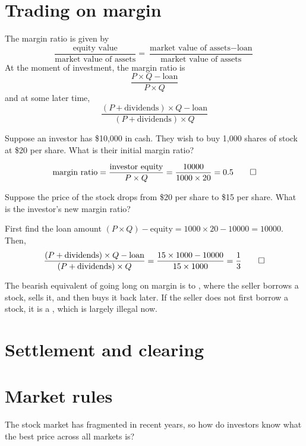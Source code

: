 \documentclass[class=bu430,notes,tikz]{agony}
\begin{document}
\section{Trading on margin}

\begin{defn}
  The margin ratio is given by
  \[ \frac{\text{equity value}}{\text{market value of assets}} = \frac{\text{market value of assets} - \text{loan}}{\text{market value of assets}} \]
  At the moment of investment, the margin ratio is
  \[ \frac{P \times Q - \text{loan}}{P \times Q} \]
  and at some later time,
  \[ \frac{(P + \text{dividends})\times Q - \text{loan}}{(P + \text{dividends}) \times Q} \]
\end{defn}

\begin{example}
  Suppose an investor has \$10,000 in cash.
  They wish to buy 1,000 shares of stock at \$20 per share.
  What is their initial margin ratio?
\end{example}
\begin{sol}
  \[ \text{margin ratio} = \frac{\text{investor equity}}{P \times Q} = \frac{10000}{1000 \times 20} = 0.5 \qedhere \]
\end{sol}

\begin{example}
  Suppose the price of the stock drops from \$20 per share to \$15 per share.
  What is the investor's new margin ratio?
\end{example}
\begin{sol}
  First find the loan amount $(P \times Q) - \text{equity} = 1000 \times 20 - 10000 = 10000$. Then,
  \[ \frac{(P + \text{dividends})\times Q - \text{loan}}{(P + \text{dividends}) \times Q} = \frac{15 \times 1000 - 10000}{15 \times 1000} = \frac13 \qedhere \]
\end{sol}

The bearish equivalent of going long on margin is to ,
where the seller borrows a stock, sells it, and then buys it back later.
If the seller does not first borrow a stock, it is a ,
which is largely illegal now.

\section{Settlement and clearing}


\section{Market rules}
The stock market has fragmented in recent years,
so how do investors know what the best price across all markets is?
\end{document}

